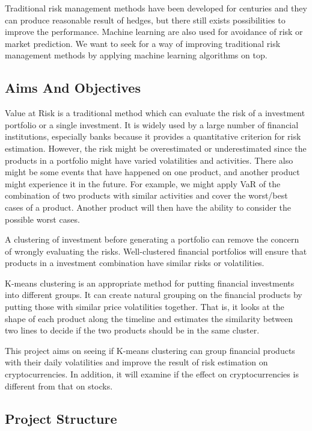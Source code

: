 \documentclass[11pt]{article} %
\theoremstyle{plain}
\theoremstyle{definition}
\begin{document}
Traditional risk management methods have been developed for centuries and they can produce reasonable result of hedges, but there still exists possibilities to improve the performance. Machine learning are also used for avoidance of risk or market prediction. We want to seek for a way of improving traditional risk management methods by applying machine learning algorithms on top.

\subsection{Aims And Objectives}

Value at Risk is a traditional method which can evaluate the risk of a investment portfolio or a single investment. It is widely used by a large number of financial institutions, especially banks because it provides a quantitative criterion for risk estimation. However, the risk might be overestimated or underestimated since the products in a portfolio might have varied volatilities and activities. There also might be some events that have happened on one product, and another product might experience it in the future. For example, we might apply VaR of the combination of two products with similar activities and cover the worst/best cases of a product. Another product will then have the ability to consider the possible worst cases.

A clustering of investment before generating a portfolio can remove the concern of wrongly evaluating the risks. Well-clustered financial portfolios will ensure that products in a investment combination have similar risks or volatilities.

K-means clustering is an appropriate method for putting financial investments into different groups. It can create natural grouping on the financial products by putting those with similar price volatilities together. That is, it looks at the shape of each product along the timeline and estimates the similarity between two lines to decide if the two products should be in the same cluster.

This project aims on seeing if K-means clustering can group financial products with their daily volatilities and improve the result of risk estimation on cryptocurrencies. In addition, it will examine if the effect on cryptocurrencies is different from that on stocks.

\subsection{Project Structure}
\end{document}
